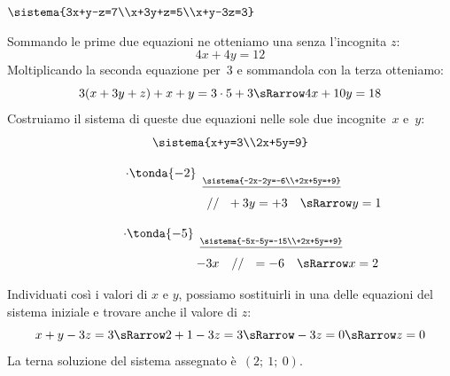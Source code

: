  \begin{esempio}{}{}
\(\sistema{3x+y-z=7\\x+3y+z=5\\x+y-3z=3}\)
\vspace{.5em}

\noindent Sommando le prime due equazioni ne otteniamo una senza l'incognita 
\(z\):
\[4x+4y=12\]
Moltiplicando la seconda equazione per~\(3\) e sommandola con la 
terza otteniamo:
\[3(x+3y+z)+x+y=3\cdot 5+3 \sRarrow 4x+10y=18\]
Costruiamo il sistema di queste due equazioni
nelle sole due incognite~\(x\) e~\(y\):
\[\sistema{x+y=3\\2x+5y=9}\]

\hspace{-20mm}
\begin{minipage}{.48\textwidth}
\[\stackrel{
  \begin{array}{l} \cdot \tonda{-2}\\ ~ \end{array}
  \underline{\sistema{-2x-2y=-6\\+2x+5y=+9}}}
  {\qquad \qquad \qquad \qquad 
   ~~~~~~~ // ~~ +3y  =+3 \quad \sRarrow y=1}\]
\end{minipage}
\begin{minipage}{.48\textwidth}
\[\stackrel{
  \begin{array}{l} \cdot \tonda{-5}\\ ~ \end{array}
  \underline{\sistema{-5x-5y=-15\\+2x+5y=+9}}}
  {\qquad \qquad \qquad \qquad 
   ~~~~ -3x ~~~ // ~~ =-6 \quad \sRarrow x=2}\]
\end{minipage}
\vspace{.5em}

Individuati così i valori di \(x\) e \(y\), possiamo sostituirli in una 
delle equazioni del sistema iniziale e trovare anche il valore di \(z\):
\[x+y-3z=3 \sRarrow 2+1-3z=3 \sRarrow -3z=0 \sRarrow z=0\]
La terna soluzione del sistema assegnato è~\((2;~1;~0)\).
 \end{esempio}

